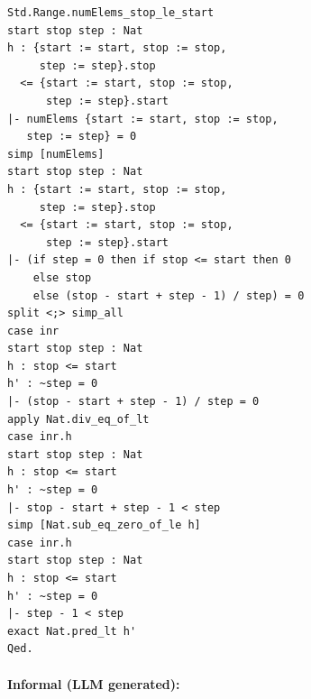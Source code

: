 \begin{small}
\begin{verbatim}
Std.Range.numElems_stop_le_start
start stop step : Nat
h : {start := start, stop := stop,
     step := step}.stop
  <= {start := start, stop := stop,
      step := step}.start
|- numElems {start := start, stop := stop,
   step := step} = 0
simp [numElems]
start stop step : Nat
h : {start := start, stop := stop,
     step := step}.stop
  <= {start := start, stop := stop,
      step := step}.start
|- (if step = 0 then if stop <= start then 0
    else stop
    else (stop - start + step - 1) / step) = 0
split <;> simp_all
case inr
start stop step : Nat
h : stop <= start
h' : ~step = 0
|- (stop - start + step - 1) / step = 0
apply Nat.div_eq_of_lt
case inr.h
start stop step : Nat
h : stop <= start
h' : ~step = 0
|- stop - start + step - 1 < step
simp [Nat.sub_eq_zero_of_le h]
case inr.h
start stop step : Nat
h : stop <= start
h' : ~step = 0
|- step - 1 < step
exact Nat.pred_lt h'
Qed.
\end{verbatim}
\end{small}

\paragraph{Informal (LLM generated):}

